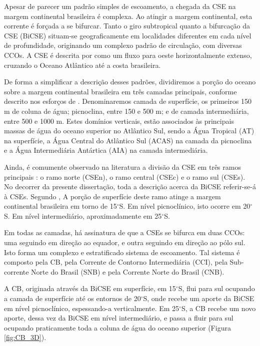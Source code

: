 Apesar de parecer um padrão simples
de escoamento, a chegada da CSE na margem continental brasileira é complexa. Ao atingir a margem continental, 
esta corrente é forçada a se bifurcar. Tanto o giro subtropical quanto a bifurcação
da CSE (BiCSE) situam-se geograficamente em localidades diferentes em cada nível de profundidade, originando 
um complexo padrão de circulação, com diversas CCOs. A CSE é descrita por \cite{wienders_etal2000} como um fluxo 
para oeste horizontalmente extenso, cruzando o Oceano Atlântico até a costa brasileira. 

De forma a simplificar a descrição desses padrões, dividiremos a porção do oceano sobre a margem continental
brasileira em três camadas principais, 
conforme descrito nos esforços de \cite{stramma_england1999}. Denominaremos camada de  
superfície, os primeiros 150 m de coluna de água; picnoclina, entre 150 e 500 m;
e de camada intermediária, entre 500 e 1000 m. Estes domínios verticais, estão associados 
às principais massas de água do oceano superior no Atlântico
Sul, sendo a Água Tropical (AT) na superfície, a Água Central do Atlântico Sul (ACAS) na camada da
picnoclina e a Água Intermediária Antártica (AIA) na camada intermediária.  

Ainda, é comumente observado na literatura a divisão da CSE em três ramos principais \citep{stramma1991}:
o ramo norte (CSEn), o ramo central (CSEc) e o ramo sul (CSEs). No decorrer da presente dissertação, toda a descrição acerca
da BiCSE referir-se-á à CSEs. Segundo \cite{stramma_england1999}, A porção de superfície
deste ramo atinge a margem continental 
brasileira em torno de 15$^\circ$S. Em nível picnoclínico, isto ocorre em 20$^\circ$S.
Em nível intermediário, aproximadamente em 25$^\circ$S. 

Em todas as camadas, há assinatura de que a CSEs se bifurca em duas CCOs: 
uma seguindo em direção ao equador, e outra seguindo em direção ao pólo sul. Isto 
forma um complexo e estratificado sistema de escoamento. Tal sistema é composto
pela CB, pela Corrente de Contorno Intermediária (CCI), pela Sub-corrente Norte
do Brasil (SNB) e pela Corrente Norte do Brasil (CNB).

A CB, originada através da BiCSE em superfície, em 15$^\circ$S, flui para sul ocupando a camada de superfície
até os entornos de 20$^\circ$S, onde recebe um aporte da BiCSE em nível picnoclínico,
espessando-a verticalmente. Em 25$^\circ$S, a CB recebe um novo aporte, dessa vez da
BiCSE em nível intermediário, e passa a fluir para sul ocupando praticamente toda a 
coluna de água do oceano superior (Figura \ref{fig:CB_3D}). 

